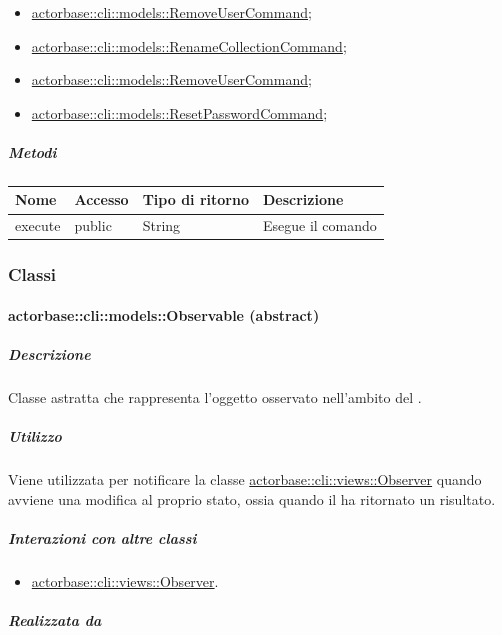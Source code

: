 \documentclass{scalatekids-article}
\begin{document}
\begin{itemize}
\item \hyperref[sec:actorbase::cli::models::RemoveUserCommand]{actorbase::cli::models::RemoveUserCommand};
\item \hyperref[sec:actorbase::cli::models::RenameCollectionCommand]{actorbase::cli::models::RenameCollectionCommand};
\item \hyperref[sec:actorbase::cli::models::RemoveUserCommand]{actorbase::cli::models::RemoveUserCommand};
\item \hyperref[sec:actorbase::cli::models::ResetPasswordCommand]{actorbase::cli::models::ResetPasswordCommand};
\end{itemize}

\subparagraph{Metodi}

\begin{tabular}{| l | l | l | l |}
  \hline
  Nome & Accesso & Tipo di ritorno & Descrizione\\
  \hline
  execute & public & String & Esegue il comando\\
  \hline
\end{tabular}

\subsubsection{Classi}

\paragraph{actorbase::cli::models::Observable (abstract)}
\label{sec:actorbase::cli::models::Observable}

\subparagraph{Descrizione}

Classe astratta che rappresenta l'oggetto osservato nell'ambito del  .

\subparagraph{Utilizzo}

Viene utilizzata per notificare la classe \hyperref[sec:actorbase::cli::views::Observer]{actorbase::cli::views::Observer}
quando avviene una modifica al proprio stato, ossia quando il 
ha ritornato un risultato.

\subparagraph{Interazioni con altre classi}

\begin{itemize}
\item \hyperref[sec:actorbase::cli::views::Observer]{actorbase::cli::views::Observer}.
\end{itemize}

\subparagraph{Realizzata da}
\end{document}
